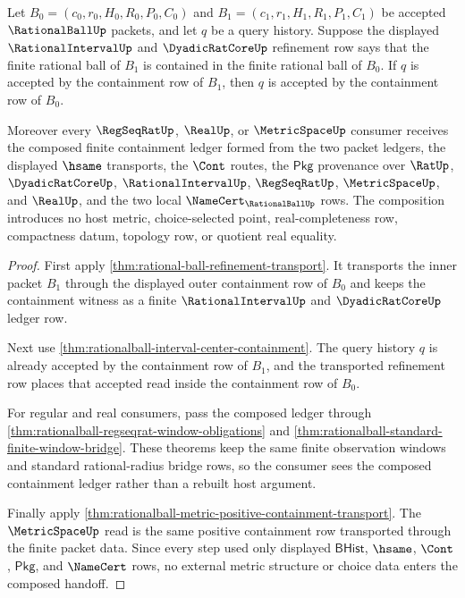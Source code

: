 \begin{theorem}
\label{thm:rationalball-nested-containment-consumer-composition}
Let $B_0=(c_0,r_0,H_0,R_0,P_0,C_0)$ and
$B_1=(c_1,r_1,H_1,R_1,P_1,C_1)$ be accepted $\RationalBallUp$ packets, and
let $q$ be a query history. Suppose the displayed
$\RationalIntervalUp$ and $\DyadicRatCoreUp$ refinement row says that the
finite rational ball of $B_1$ is contained in the finite rational ball of
$B_0$. If $q$ is accepted by the containment row of $B_1$, then $q$ is accepted
by the containment row of $B_0$.

Moreover every $\RegSeqRatUp$, $\RealUp$, or $\MetricSpaceUp$ consumer receives
the composed finite containment ledger formed from the two packet ledgers, the
displayed $\hsame$ transports, the $\Cont$ routes, the $\mathsf{Pkg}$
provenance over $\RatUp$, $\DyadicRatCoreUp$, $\RationalIntervalUp$,
$\RegSeqRatUp$, $\MetricSpaceUp$, and $\RealUp$, and the two local
$\NameCert_{\RationalBallUp}$ rows. The composition introduces no host metric,
choice-selected point, real-completeness row, compactness datum, topology row,
or quotient real equality.
\end{theorem}
\begin{proof}
First apply \autoref{thm:rational-ball-refinement-transport}. It transports
the inner packet $B_1$ through the displayed outer containment row of $B_0$ and
keeps the containment witness as a finite $\RationalIntervalUp$ and
$\DyadicRatCoreUp$ ledger row.

Next use \autoref{thm:rationalball-interval-center-containment}. The query
history $q$ is already accepted by the containment row of $B_1$, and the
transported refinement row places that accepted read inside the containment row
of $B_0$.

For regular and real consumers, pass the composed ledger through
\autoref{thm:rationalball-regseqrat-window-obligations} and
\autoref{thm:rationalball-standard-finite-window-bridge}. These theorems keep
the same finite observation windows and standard rational-radius bridge rows,
so the consumer sees the composed containment ledger rather than a rebuilt host
argument.

Finally apply
\autoref{thm:rationalball-metric-positive-containment-transport}. The
$\MetricSpaceUp$ read is the same positive containment row transported through
the finite packet data. Since every step used only displayed $\mathsf{BHist}$,
$\hsame$, $\Cont$, $\mathsf{Pkg}$, and $\NameCert$ rows, no external metric
structure or choice data enters the composed handoff.
\end{proof}

